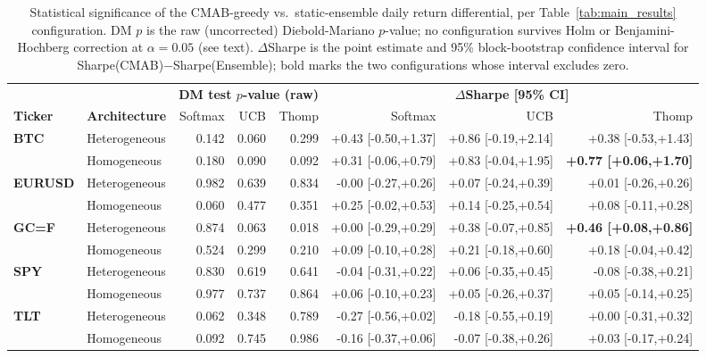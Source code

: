 \documentclass[pdflatex,sn-mathphys-num]{sn-jnl}
\theoremstyle{thmstyleone}%
\theoremstyle{thmstyletwo}%
\theoremstyle{thmstylethree}%
\begin{document}
\begin{table}
    \centering
    \caption{Statistical significance of the CMAB-greedy vs.\ static-ensemble daily return differential, per Table~\ref{tab:main_results} configuration. DM $p$ is the raw (uncorrected) Diebold-Mariano $p$-value; no configuration survives Holm or Benjamini-Hochberg correction at $\alpha=0.05$ (see text). $\Delta$Sharpe is the point estimate and 95\% block-bootstrap confidence interval for Sharpe(CMAB)$-$Sharpe(Ensemble); bold marks the two configurations whose interval excludes zero.}
    \label{tab:significance}
    \setlength{\tabcolsep}{3pt}
    \scriptsize
    \begin{tabular}{@{} ll rrr rrr @{}}
    \toprule
     & & \multicolumn{3}{c}{\textbf{DM test $p$-value (raw)}} & \multicolumn{3}{c}{\textbf{$\Delta$Sharpe [95\% CI]}} \\
    \cmidrule(lr){3-5} \cmidrule(lr){6-8}
    \textbf{Ticker} & \textbf{Architecture} & Softmax & UCB & Thomp & Softmax & UCB & Thomp \\
    \midrule
    \multirow{2}{*}{\textbf{BTC}} & Heterogeneous & 0.142 & 0.060 & 0.299 & +0.43 [-0.50,+1.37] & +0.86 [-0.19,+2.14] & +0.38 [-0.53,+1.43] \\
     & Homogeneous & 0.180 & 0.090 & 0.092 & +0.31 [-0.06,+0.79] & +0.83 [-0.04,+1.95] & \textbf{+0.77 [+0.06,+1.70]} \\
    \midrule
    \multirow{2}{*}{\textbf{EURUSD}} & Heterogeneous & 0.982 & 0.639 & 0.834 & -0.00 [-0.27,+0.26] & +0.07 [-0.24,+0.39] & +0.01 [-0.26,+0.26] \\
     & Homogeneous & 0.060 & 0.477 & 0.351 & +0.25 [-0.02,+0.53] & +0.14 [-0.25,+0.54] & +0.08 [-0.11,+0.28] \\
    \midrule
    \multirow{2}{*}{\textbf{GC=F}} & Heterogeneous & 0.874 & 0.063 & 0.018 & +0.00 [-0.29,+0.29] & +0.38 [-0.07,+0.85] & \textbf{+0.46 [+0.08,+0.86]} \\
     & Homogeneous & 0.524 & 0.299 & 0.210 & +0.09 [-0.10,+0.28] & +0.21 [-0.18,+0.60] & +0.18 [-0.04,+0.42] \\
    \midrule
    \multirow{2}{*}{\textbf{SPY}} & Heterogeneous & 0.830 & 0.619 & 0.641 & -0.04 [-0.31,+0.22] & +0.06 [-0.35,+0.45] & -0.08 [-0.38,+0.21] \\
     & Homogeneous & 0.977 & 0.737 & 0.864 & +0.06 [-0.10,+0.23] & +0.05 [-0.26,+0.37] & +0.05 [-0.14,+0.25] \\
    \midrule
    \multirow{2}{*}{\textbf{TLT}} & Heterogeneous & 0.062 & 0.348 & 0.789 & -0.27 [-0.56,+0.02] & -0.18 [-0.55,+0.19] & +0.00 [-0.31,+0.32] \\
     & Homogeneous & 0.092 & 0.745 & 0.986 & -0.16 [-0.37,+0.06] & -0.07 [-0.38,+0.26] & +0.03 [-0.17,+0.24] \\
    \bottomrule
    \end{tabular}
\end{table}
\end{document}
